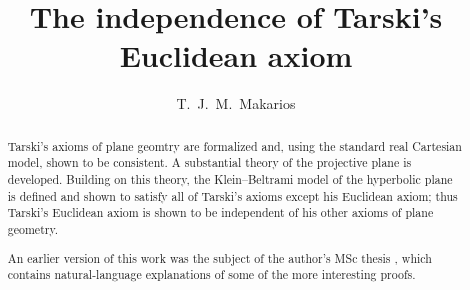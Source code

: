 \documentclass[11pt,a4paper]{article}
\begin{document}
\title{The independence of Tarski's Euclidean axiom}
\author{T.~J.~M.~Makarios}
\maketitle

\begin{abstract}
Tarski's axioms of plane geomtry are formalized and, using the standard real Cartesian model, shown to be consistent.
A substantial theory of the projective plane is developed.
Building on this theory, the Klein--Beltrami model of the hyperbolic plane is defined and shown to satisfy all of Tarski's axioms except his Euclidean axiom;
thus Tarski's Euclidean axiom is shown to be independent of his other axioms of plane geometry.

An earlier version of this work was the subject of the author's MSc thesis \cite{makarios}, which contains natural-language explanations of some of the more interesting proofs.
\end{abstract}

\tableofcontents





\end{document}
